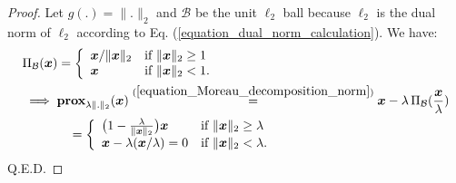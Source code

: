 \documentclass[lang=cn,10pt]{gorgeousnbook}
\numberwithin{equation}{section}%
\numberwithin{figure}{section}%
\begin{document}
\begin{proof}
Let $g(.) = \|.\|_2$ and $\mathcal{B}$ be the unit $\ell_2$ ball because $\ell_2$ is the dual norm of $\ell_2$ according to Eq. (\ref{equation_dual_norm_calculation}). We have:
\begin{align*}
&\Pi_\mathcal{B}(\boldsymbol{x}) = 
\left\{
    \begin{array}{ll}
        \boldsymbol{x} / \|\boldsymbol{x}\|_2 & \mbox{if } \|\boldsymbol{x}\|_2 \geq 1 \\
        \boldsymbol{x} & \mbox{if } \|\boldsymbol{x}\|_2 < 1.
    \end{array}
\right. \\
& \implies \textbf{prox}_{\lambda \|.\|_2}(\boldsymbol{x}) \overset{(\ref{equation_Moreau_decomposition_norm})}{=} \boldsymbol{x} - \lambda\, \Pi_\mathcal{B}(\frac{\boldsymbol{x}}{\lambda}) \\
&~~~~~~~~~~~= 
\left\{
    \begin{array}{ll}
        \big( 1 - \frac{\lambda}{\|\boldsymbol{x}\|_2} \big) \boldsymbol{x} & \mbox{if } \|\boldsymbol{x}\|_2 \geq \lambda \\
        \boldsymbol{x} - \lambda (\boldsymbol{x} / \lambda) = 0 & \mbox{if } \|\boldsymbol{x}\|_2 < \lambda.
    \end{array}
\right.
\end{align*}
Q.E.D.
\end{proof}
\end{document}
